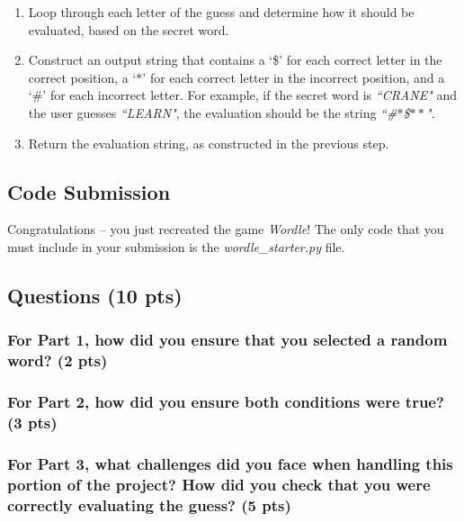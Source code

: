 \documentclass{article}
\begin{document}
\begin{enumerate}
\itemsep0em 
\item{Loop through each letter of the guess and determine how it should be evaluated, based on the secret word.}
\item{Construct an output string that contains a `\$' for each correct letter in the correct position, a `$\ast$' for each correct letter in the incorrect position, and a `\#' for each incorrect letter. For example, if the secret word is \emph{``CRANE"} and the user guesses \emph{``LEARN"}, the evaluation should be the string \emph{``\#$\ast$\$$\ast \ast$"}.}
\item{Return the evaluation string, as constructed in the previous step.}
\end{enumerate}

\subsection{Code Submission}
Congratulations -- you just recreated the game \emph{Wordle}! The only code that you must include in your submission is the \emph{wordle\_starter.py} file.

\newpage
\subsection{Questions (10 pts)}
\subsubsection{For Part 1, how did you ensure that you selected a random word? (2 pts)}
\vspace{2in}

\subsubsection{For Part 2, how did you ensure both conditions were true? (3 pts)}
\vspace{2in}

\subsubsection{For Part 3, what challenges did you face when handling this portion of the project? How did you check that you were correctly evaluating the guess? (5 pts)}
\vspace{2in}
\end{document}
